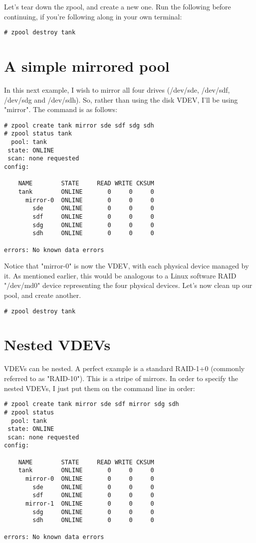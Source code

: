 \documentclass{book}
\begin{document}
Let's tear down the zpool, and create a new one. Run the following before
continuing, if you're following along in your own terminal:

\begin{lstlisting}
# zpool destroy tank
\end{lstlisting}

\section{A simple mirrored pool}
In this next example, I wish to mirror all four drives (/dev/sde, /dev/sdf,
/dev/sdg and /dev/sdh). So, rather than using the disk VDEV, I'll be using
"mirror". The command is as follows:

\begin{lstlisting}
# zpool create tank mirror sde sdf sdg sdh
# zpool status tank
  pool: tank
 state: ONLINE
 scan: none requested
config:

    NAME        STATE     READ WRITE CKSUM
    tank        ONLINE       0     0     0
      mirror-0  ONLINE       0     0     0
        sde     ONLINE       0     0     0
        sdf     ONLINE       0     0     0
        sdg     ONLINE       0     0     0
        sdh     ONLINE       0     0     0

errors: No known data errors
\end{lstlisting}

Notice that "mirror-0" is now the VDEV, with each physical device managed by
it. As mentioned earlier, this would be analogous to a Linux software RAID
"/dev/md0" device representing the four physical devices. Let's now clean up
our pool, and create another.

\begin{lstlisting}
# zpool destroy tank
\end{lstlisting}

\section{Nested VDEVs}
VDEVs can be nested. A perfect example is a standard RAID-1+0 (commonly
referred to as "RAID-10"). This is a stripe of mirrors. In order to specify the
nested VDEVs, I just put them on the command line in order:

\begin{lstlisting}
# zpool create tank mirror sde sdf mirror sdg sdh
# zpool status
  pool: tank
 state: ONLINE
 scan: none requested
config:

    NAME        STATE     READ WRITE CKSUM
    tank        ONLINE       0     0     0
      mirror-0  ONLINE       0     0     0
        sde     ONLINE       0     0     0
        sdf     ONLINE       0     0     0
      mirror-1  ONLINE       0     0     0
        sdg     ONLINE       0     0     0
        sdh     ONLINE       0     0     0

errors: No known data errors
\end{lstlisting}
\end{document}
